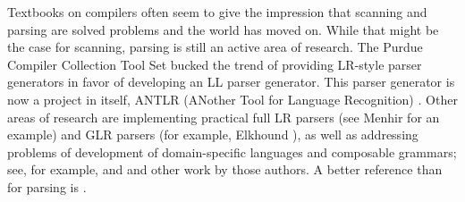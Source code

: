 Textbooks on compilers often seem to give the impression that scanning and parsing are solved problems and the world has moved on. While that might be the case for scanning, parsing is still an active area of research. The Purdue Compiler Collection Tool Set bucked the trend of providing LR-style parser generators in favor of developing an LL parser generator. This parser generator is now a project in itself, ANTLR (ANother Tool for Language Recognition) \citep{Parr:ANTLR:1995}. Other areas of research are implementing practical full LR parsers (see Menhir \citep{Pottier:Menhir:2007} for an example) and GLR parsers (for example, Elkhound \cite{McPeak:Elkhound:2002}), as well as addressing problems of development of domain-specific languages and composable grammars; see, for example, \citet{Wyk:Context-aware:2007} and \citet{Bravenboer:Concrete:2004} and other work by those authors.\nocite{Bravenboer:Declarative:2006}\nocite{Bravenboer:Preventing:2007} A better reference than \citet{Aho:Compilers:2006} for parsing is \citet{Grune:Parsing:2007}.
